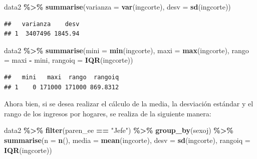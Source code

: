 \documentclass[
  spanish,
  12pt,
]{book}
\newenvironment{Shaded}{\begin{snugshade}}{\end{snugshade}}
\newcommand{\AttributeTok}[1]{\textcolor[rgb]{0.13,0.29,0.53}{#1}}
\newcommand{\FunctionTok}[1]{\textcolor[rgb]{0.13,0.29,0.53}{\textbf{#1}}}
\newcommand{\NormalTok}[1]{#1}
\newcommand{\SpecialCharTok}[1]{\textcolor[rgb]{0.81,0.36,0.00}{\textbf{#1}}}
\newcommand{\StringTok}[1]{\textcolor[rgb]{0.31,0.60,0.02}{#1}}
\begin{document}
\begin{Shaded}
\begin{Highlighting}[]
\NormalTok{data2 }\SpecialCharTok{\%\textgreater{}\%} \FunctionTok{summarise}\NormalTok{(}\AttributeTok{varianza =} \FunctionTok{var}\NormalTok{(ingcorte),}
                    \AttributeTok{desv =} \FunctionTok{sd}\NormalTok{(ingcorte))}
\end{Highlighting}
\end{Shaded}

\begin{verbatim}
##   varianza    desv
## 1  3407496 1845.94
\end{verbatim}

\begin{Shaded}
\begin{Highlighting}[]
\NormalTok{data2 }\SpecialCharTok{\%\textgreater{}\%} \FunctionTok{summarise}\NormalTok{(}\AttributeTok{mini =} \FunctionTok{min}\NormalTok{(ingcorte),}
                    \AttributeTok{maxi =} \FunctionTok{max}\NormalTok{(ingcorte),}
                    \AttributeTok{rango =}\NormalTok{ maxi }\SpecialCharTok{{-}}\NormalTok{ mini,}
                    \AttributeTok{rangoiq =} \FunctionTok{IQR}\NormalTok{(ingcorte))}
\end{Highlighting}
\end{Shaded}

\begin{verbatim}
##   mini   maxi  rango  rangoiq
## 1    0 171000 171000 869.8312
\end{verbatim}

Ahora bien, si se desea realizar el cálculo de la media, la desviación estándar y el rango de los ingresos por hogares, se realiza de la siguiente manera:

\begin{Shaded}
\begin{Highlighting}[]
\NormalTok{data2 }\SpecialCharTok{\%\textgreater{}\%} \FunctionTok{filter}\NormalTok{(paren\_ee }\SpecialCharTok{==} \StringTok{"Jefe"}\NormalTok{) }\SpecialCharTok{\%\textgreater{}\%}
  \FunctionTok{group\_by}\NormalTok{(sexoj) }\SpecialCharTok{\%\textgreater{}\%}
  \FunctionTok{summarise}\NormalTok{(}\AttributeTok{n =} \FunctionTok{n}\NormalTok{(),}
            \AttributeTok{media =} \FunctionTok{mean}\NormalTok{(ingcorte),}
            \AttributeTok{desv =} \FunctionTok{sd}\NormalTok{(ingcorte),}
            \AttributeTok{rangoiq =} \FunctionTok{IQR}\NormalTok{(ingcorte))}
\end{Highlighting}
\end{Shaded}
\end{document}
